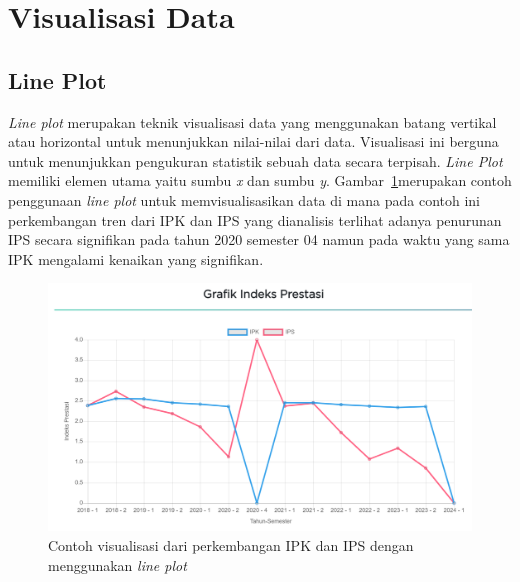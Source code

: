 \section{Visualisasi Data}
\label{sec:visdat}

\subsection{Line Plot}
\label{subsec:lineplo}

\textit{Line plot} merupakan teknik visualisasi data yang menggunakan batang vertikal atau horizontal untuk menunjukkan nilai-nilai dari data. Visualisasi ini berguna untuk menunjukkan pengukuran statistik sebuah data secara terpisah. \textit{Line Plot} memiliki elemen utama yaitu sumbu \textit{x} dan sumbu \textit{y}. Gambar~\ref{fig:contoh lineplot}merupakan contoh penggunaan \textit{line plot} untuk memvisualisasikan data di mana pada contoh ini perkembangan tren dari IPK dan IPS yang dianalisis terlihat adanya penurunan IPS secara signifikan pada tahun 2020 semester 04 namun pada waktu yang sama IPK mengalami kenaikan yang signifikan. 
\begin{figure}[H]
    \centering
    \includegraphics[width=0.5\linewidth]{Gambar/ContohLineChart.png}
    \caption{Contoh visualisasi dari perkembangan IPK dan IPS dengan menggunakan \textit{line plot}}
    \label{fig:contoh lineplot}
\end{figure}

